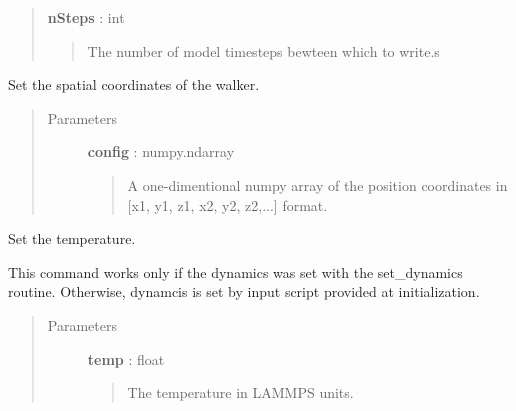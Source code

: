 \documentclass[letterpaper,10pt,english]{sphinxmanual}
\begin{document}
\begin{fulllineitems}
\begin{fulllineitems}
\begin{quote}
\begin{description}
\textbf{nSteps} : int
\begin{quote}

The number of model timesteps bewteen which to write.s
\end{quote}

\end{description}\end{quote}

\end{fulllineitems}


\begin{fulllineitems}
\label{walker_api/walker_api.doc:walker_api.lammps_walker.Lammps.set_position}
Set the spatial coordinates of the walker.
\begin{quote}\begin{description}
\item[{Parameters}] \leavevmode
\textbf{config} : numpy.ndarray
\begin{quote}

A one-dimentional numpy array of the position coordinates in {[}x1, y1, z1, x2, y2, z2,...{]} format.
\end{quote}

\end{description}\end{quote}

\end{fulllineitems}


\begin{fulllineitems}
\label{walker_api/walker_api.doc:walker_api.lammps_walker.Lammps.set_temperature}
Set the temperature.

This command works only if the dynamics was set with the set\_dynamics routine. Otherwise, dynamcis is set by input script provided at initialization.
\begin{quote}\begin{description}
\item[{Parameters}] \leavevmode
\textbf{temp} : float
\begin{quote}

The temperature in LAMMPS units.
\end{quote}


\end{description}
\end{quote}
\end{fulllineitems}
\end{fulllineitems}
\end{document}
